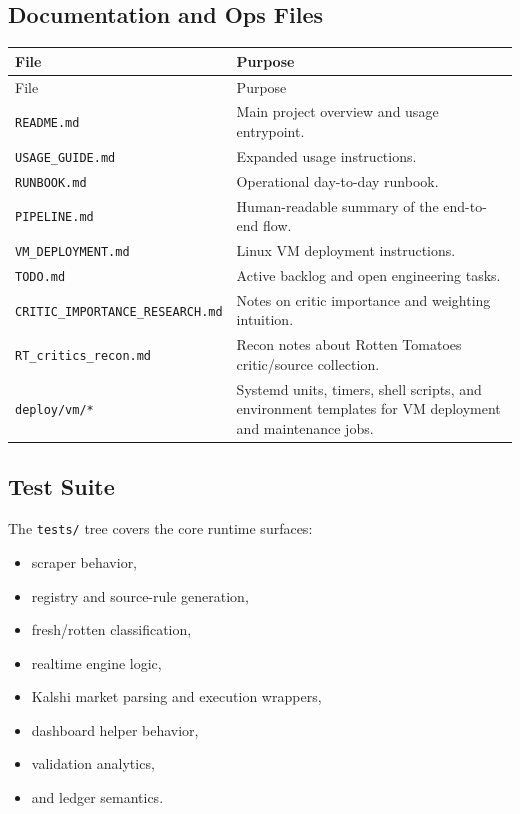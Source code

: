 \documentclass[11pt]{article}
\begin{document}
\subsection{Documentation and Ops Files}
\begin{longtable}{>{\ttfamily}p{}p{}}
\toprule
File & Purpose \\
\midrule
\endfirsthead
\toprule
File & Purpose \\
\midrule
\endhead
\textnormal{\texttt{README.md}} & Main project overview and usage entrypoint. \\
\textnormal{\texttt{USAGE\_GUIDE.md}} & Expanded usage instructions. \\
\textnormal{\texttt{RUNBOOK.md}} & Operational day-to-day runbook. \\
\textnormal{\texttt{PIPELINE.md}} & Human-readable summary of the end-to-end flow. \\
\textnormal{\texttt{VM\_DEPLOYMENT.md}} & Linux VM deployment instructions. \\
\textnormal{\texttt{TODO.md}} & Active backlog and open engineering tasks. \\
\textnormal{\texttt{CRITIC\_IMPORTANCE\_RESEARCH.md}} & Notes on critic importance and weighting intuition. \\
\textnormal{\texttt{RT\_critics\_recon.md}} & Recon notes about Rotten Tomatoes critic/source collection. \\
\textnormal{\texttt{deploy/vm/*}} & Systemd units, timers, shell scripts, and environment templates for VM deployment and maintenance jobs. \\
\bottomrule
\end{longtable}

\subsection{Test Suite}
The \texttt{tests/} tree covers the core runtime surfaces:
\begin{itemize}[leftmargin=1.5em]
    \item scraper behavior,
    \item registry and source-rule generation,
    \item fresh/rotten classification,
    \item realtime engine logic,
    \item Kalshi market parsing and execution wrappers,
    \item dashboard helper behavior,
    \item validation analytics,
    \item and ledger semantics.
\end{itemize}
\end{document}
